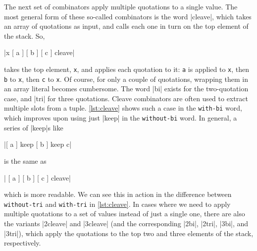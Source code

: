 The next set of combinators apply multiple quotations to a single value.  The
most general form of these so-called  combinators is the word
\factor|cleave|, which takes an array of quotations as input, and calls each
one in turn on the top element of the stack.  So,
%
\begin{center} \factor|x { [ a ] [ b ] [ c ] } cleave| \end{center}
%
takes the top element, \Verb|x|, and applies each quotation to it: \Verb|a| is
applied to \Verb|x|, then \Verb|b| to \Verb|x|, then \Verb|c| to \Verb|x|.  Of
course, for only a couple of quotations, wrapping them in an array literal
becomes cumbersome.  The word \factor|bi| exists for the two-quotation case,
and \factor|tri| for three quotations.  Cleave combinators are often used to
extract multiple slots from a tuple.  \vref{lst:cleave} shows such a case in
the \Verb|with-bi| word, which improves upon using just \factor|keep| in the
\Verb|without-bi| word.  In general, a series of \factor|keep|s like
%
\begin{center} \factor|[ a ] keep [ b ] keep c| \end{center}
%
is the same as
%
\begin{center} \factor|{ [ a ] [ b ] [ c ] } cleave| \end{center}
%
which is more readable.  We can see this in action in the difference between
\Verb|without-tri| and \Verb|with-tri| in \vref{lst:cleave}.  In cases where we
need to apply multiple quotations to a set of values instead of just a single
one, there are also the variants \factor|2cleave| and \factor|3cleave| (and the
corresponding \factor|2bi|, \factor|2tri|, \factor|3bi|, and \factor|3tri|),
which apply the quotations to the top two and three elements of the stack,
respectively.


